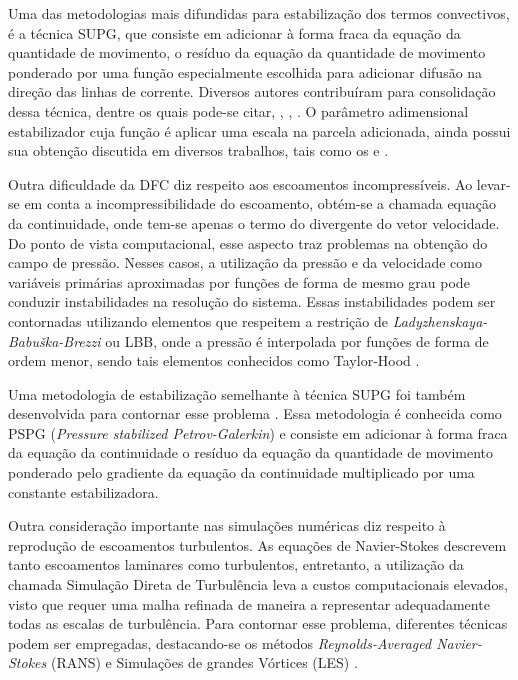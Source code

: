 \documentclass[tese_patricia.tex]{subfiles}
\begin{document}
Uma das metodologias mais difundidas para estabilização dos termos convectivos, é a técnica SUPG, que consiste em adicionar à forma fraca da equação da quantidade de movimento, o resíduo da equação da quantidade de movimento ponderado por uma função especialmente escolhida para adicionar difusão na direção das linhas de corrente. Diversos autores contribuíram para consolidação dessa técnica, dentre os quais pode-se citar, , , . O parâmetro adimensional estabilizador cuja função é aplicar uma escala na parcela adicionada, ainda possui sua obtenção discutida em diversos trabalhos, tais como os  e .

Outra dificuldade da DFC diz respeito aos escoamentos incompressíveis. Ao levar-se em conta a incompressibilidade do escoamento, obtém-se a chamada equação da continuidade, onde tem-se apenas o termo do divergente do vetor velocidade. Do ponto de vista computacional, esse aspecto traz problemas na obtenção do campo de pressão. Nesses casos, a utilização da pressão e da velocidade como variáveis primárias aproximadas por funções de forma de mesmo grau pode conduzir instabilidades na resolução do sistema. Essas instabilidades podem ser contornadas utilizando elementos que respeitem a restrição de \textit{Ladyzhenskaya-Babuška-Brezzi} ou LBB, onde a pressão é interpolada por funções de forma de ordem menor, sendo tais elementos conhecidos como Taylor-Hood \cite{BrezziF:1991,ZienkiewiczTN:2005,StrangF:2008}.

Uma metodologia de estabilização semelhante à técnica SUPG foi também desenvolvida para contornar esse problema \cite{HughesFB:1986,TezduyarMRS:1992a}. Essa metodologia é conhecida como PSPG (\textit{Pressure stabilized Petrov-Galerkin}) e consiste em adicionar à forma fraca da equação da continuidade o resíduo da equação da quantidade de movimento ponderado pelo gradiente da equação da continuidade multiplicado por uma constante estabilizadora.

Outra consideração importante nas simulações numéricas diz respeito à reprodução de escoamentos turbulentos. As equações de Navier-Stokes descrevem tanto escoamentos laminares como turbulentos, entretanto, a utilização da chamada Simulação Direta de Turbulência leva a custos computacionais elevados, visto que requer uma malha refinada de maneira a representar adequadamente todas as escalas de turbulência. Para contornar esse problema, diferentes técnicas podem ser empregadas, destacando-se os métodos \textit{Reynolds-Averaged Navier-Stokes} (RANS) \cite{Speziale1991,Alfonsi2009} e Simulações de grandes Vórtices (LES) \cite{LaunderS:1972,Germano1991,Wilcox:1993,PIOMELLI1999}.
\end{document}
